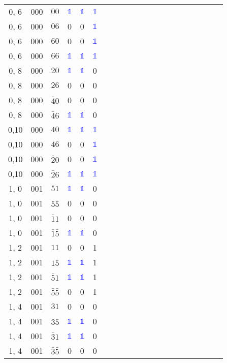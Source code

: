 \begin{longtable*}{c| cccccccccccccccccccc }
0, 6& 000& $00$& \textcolor{blue}{$\mathds{1}$}& \textcolor{blue}{$\mathds{1}$}& \textcolor{blue}{$\mathds{1}$}\\
0, 6& 000& $06$& 0& 0& \textcolor{blue}{$\mathds{1}$}\\
0, 6& 000& $60$& 0& 0& \textcolor{blue}{$\mathds{1}$}\\
0, 6& 000& $66$& \textcolor{blue}{$\mathds{1}$}& \textcolor{blue}{$\mathds{1}$}& \textcolor{blue}{$\mathds{1}$}\\
0, 8& 000& $20$& \textcolor{blue}{$\mathds{1}$}& \textcolor{blue}{$\mathds{1}$}& 0\\
0, 8& 000& $26$& 0& 0& 0\\
0, 8& 000& $\bar{4}0$& 0& 0& 0\\
0, 8& 000& $\bar{4}6$& \textcolor{blue}{$\mathds{1}$}& \textcolor{blue}{$\mathds{1}$}& 0\\
0,10& 000& $40$& \textcolor{blue}{$\mathds{1}$}& \textcolor{blue}{$\mathds{1}$}& \textcolor{blue}{$\mathds{1}$}\\
0,10& 000& $46$& 0& 0& \textcolor{blue}{$\mathds{1}$}\\
0,10& 000& $\bar{2}0$& 0& 0& \textcolor{blue}{$\mathds{1}$}\\
0,10& 000& $\bar{2}6$& \textcolor{blue}{$\mathds{1}$}& \textcolor{blue}{$\mathds{1}$}& \textcolor{blue}{$\mathds{1}$}\\
1, 0& 001& $51$& \textcolor{blue}{$\mathds{1}$}& \textcolor{blue}{$\mathds{1}$}& 0\\
1, 0& 001& $5\bar{5}$& 0& 0& 0\\
1, 0& 001& $\bar{1}1$& 0& 0& 0\\
1, 0& 001& $\bar{1}\bar{5}$& \textcolor{blue}{$\mathds{1}$}& \textcolor{blue}{$\mathds{1}$}& 0\\
1, 2& 001& $11$& 0& 0& 1\\
1, 2& 001& $1\bar{5}$& \textcolor{blue}{$\mathds{1}$}& \textcolor{blue}{$\mathds{1}$}& 1\\
1, 2& 001& $\bar{5}1$& \textcolor{blue}{$\mathds{1}$}& \textcolor{blue}{$\mathds{1}$}& 1\\
1, 2& 001& $\bar{5}\bar{5}$& 0& 0& 1\\
1, 4& 001& $31$& 0& 0& 0\\
1, 4& 001& $3\bar{5}$& \textcolor{blue}{$\mathds{1}$}& \textcolor{blue}{$\mathds{1}$}& 0\\
1, 4& 001& $\bar{3}1$& \textcolor{blue}{$\mathds{1}$}& \textcolor{blue}{$\mathds{1}$}& 0\\
1, 4& 001& $\bar{3}\bar{5}$& 0& 0& 0\\

\end{longtable*}

